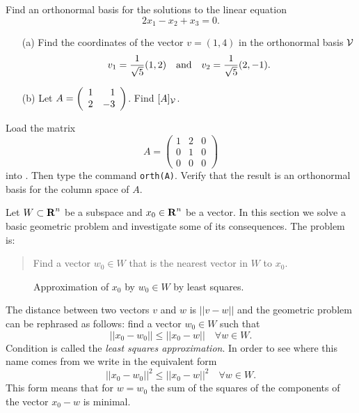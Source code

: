\EXER

\TEXER

\begin{exercise} \label{c7.4.1}
Find an orthonormal basis for the solutions to the linear equation
\[
2x_1-x_2+x_3=0.
\]
\end{exercise}

\begin{exercise} \label{c7.4.2}
\begin{itemize}
\item[(a)] Find the coordinates of the vector $v=(1,4)$ in the orthonormal
basis ${\cal V}$
\[
v_1 = \frac{1}{\sqrt{5}}(1,2) \quad\mbox{and}\quad v_2 = \frac{1}{\sqrt{5}}(2,-1).
\]
\item[(b)]  Let $A=\left(\begin{array}{rr} 1 & 1\\ 2 &-3\end{array}\right)$. Find $[A]_{\cal V}$.
\end{itemize}
\end{exercise}




\CEXER

\begin{exercise} \label{c7.4.3}
Load the matrix
\[
A=\left(\begin{array}{rrr} 1 & 2 & 0\\ 0 & 1 & 0\\
0 & 0 & 0\end{array}\right)
\]
into \Matlabp.  Then type the command {\tt orth(A)}.
Verify that the result is an orthonormal basis for the column space of $A$.
\end{exercise}



  \label{S:LSA}

Let $W\subset\mbox{$\bf{R}$}^n$ be a subspace and $x_0\in\mbox{$\bf{R}$}^n$ be a vector.  In this
section we solve a basic geometric problem and investigate some of its
consequences.  The problem is:
\begin{quote}
Find a vector $w_0\in W$ that is the nearest vector in $W$ to $x_0$.
\end{quote}

\begin{figure}[htb]
        \centerline{%
        }
        \caption{Approximation of $x_0$ by $w_0\in W$ by least squares.}
        \label{F:nearest}
\end{figure}


The distance between two vectors
$v$ and $w$ is $||v-w||$ and the geometric
problem can be rephrased as follows: find a vector $w_0\in W$ such that
\begin{equation}  \label{E:leastsq}
||x_0-w_0||\leq ||x_0-w|| \quad \forall w\in W.
\end{equation}
Condition  is called the
{\em least squares approximation}.
In order to see where this name comes from we write in the
equivalent form
\[
||x_0-w_0||^2\leq ||x_0-w||^2 \quad \forall w\in W.
\]
This form means that for $w=w_0$ the sum of the squares of the
components of the vector $x_0-w$ is minimal.

